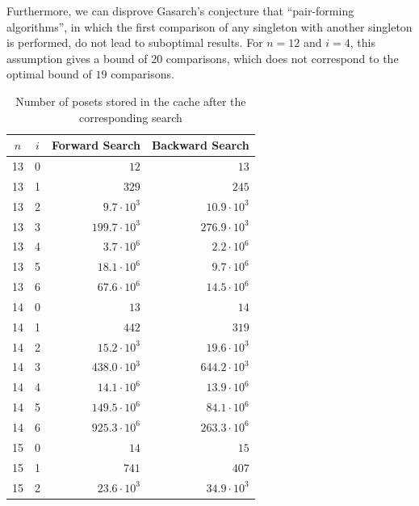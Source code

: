 \documentclass[10pt,journal,compsoc]{IEEEtran}
\begin{document}
Furthermore, we can disprove Gasarch's \cite{Gasarch1996} conjecture that ``pair-forming algorithms'', in which the first comparison of any singleton with another singleton is performed, do not lead to suboptimal results.
For $n = 12$ and $i = 4$, this assumption gives a bound of $20$ comparisons, which does not correspond to the optimal bound of $19$ comparisons.

\begin{table}[!t]
  \renewcommand{\arraystretch}{1.2}
  \caption{Number of posets stored in the cache after the corresponding search}
  \label{table:cache_entries}
  \centering
  \begin{tabular}{c|c|r|r}
    $n$ & $i$ & \textbf{Forward Search} & \textbf{Backward Search} \\
    \hline
    13  & 0   & $12$                    & $13$                     \\
    13  & 1   & $329$                   & $245$                    \\
    13  & 2   & $9.7 \cdot 10^3$        & $10.9 \cdot 10^3$        \\
    13  & 3   & $199.7 \cdot 10^3$      & $276.9 \cdot 10^3$       \\
    13  & 4   & $3.7 \cdot 10^6$        & $2.2 \cdot 10^6$         \\
    13  & 5   & $18.1 \cdot 10^6$       & $9.7 \cdot 10^6$         \\
    13  & 6   & $67.6 \cdot 10^6$       & $14.5 \cdot 10^6$        \\
    \hline
    14  & 0   & $13$                    & $14$                     \\
    14  & 1   & $442$                   & $319$                    \\
    14  & 2   & $15.2 \cdot 10^3$       & $19.6 \cdot 10^3$        \\
    14  & 3   & $438.0 \cdot 10^3$      & $644.2 \cdot 10^3$       \\
    14  & 4   & $14.1 \cdot 10^6$       & $13.9 \cdot 10^6$        \\
    14  & 5   & $149.5 \cdot 10^6$      & $84.1 \cdot 10^6$        \\
    14  & 6   & $925.3 \cdot 10^6$      & $263.3 \cdot 10^6$       \\
    \hline
    15  & 0   & $14$                    & $15$                     \\
    15  & 1   & $741$                   & $407$                    \\
    15  & 2   & $23.6 \cdot 10^3$       & $34.9 \cdot 10^3$        \\

\end{tabular}
\end{table}
\end{document}
